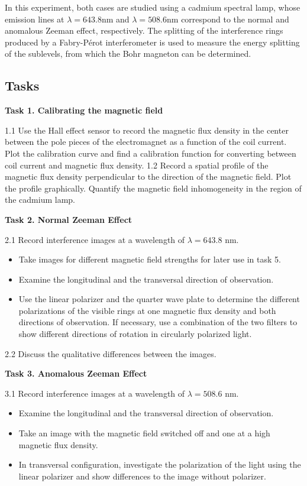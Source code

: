 \documentclass{article}
\begin{document}
In this experiment, both cases are studied using a cadmium spectral lamp, whose emission lines at $\lambda = 643.8$nm and $\lambda = 508.6$nm correspond to the normal and anomalous Zeeman effect, respectively. The splitting of the interference rings produced by a Fabry-Pérot interferometer is used to measure the energy splitting of the sublevels, from which the Bohr magneton can be determined.

\subsection{Tasks}
\textbf{Task 1. Calibrating the magnetic field}

1.1 Use the Hall effect sensor to record the magnetic flux density in the center between the pole pieces of the electromagnet as a function of the coil current. Plot the calibration curve and find a calibration function for converting between coil current and magnetic flux density.
1.2 Record a spatial profile of the magnetic flux density perpendicular to the direction of the magnetic field. Plot the profile graphically. Quantify the magnetic field inhomogeneity in the region of the cadmium lamp.

\textbf{Task 2. Normal Zeeman Effect}

2.1 Record interference images at a wavelength of $\lambda = 643.8$ nm.
\begin{itemize}
    \item Take images for different magnetic field strengths for later use in task 5.
    \item Examine the longitudinal and the transversal direction of observation.
    \item Use the linear polarizer and the quarter wave plate to determine the different polarizations of the visible rings at one magnetic flux density and both directions of observation. If necessary, use a combination of the two filters to show different directions of rotation in circularly polarized light.
\end{itemize}

2.2 Discuss the qualitative differences between the images.

\textbf{Task 3. Anomalous Zeeman Effect}

3.1 Record interference images at a wavelength of $\lambda = 508.6$ nm.
\begin{itemize}
    \item Examine the longitudinal and the transversal direction of observation.
    \item Take an image with the magnetic field switched off and one at a high magnetic flux density.
    \item  In transversal configuration, investigate the polarization of the light using the linear polarizer and show differences to the image without polarizer.
\end{itemize}
\end{document}
